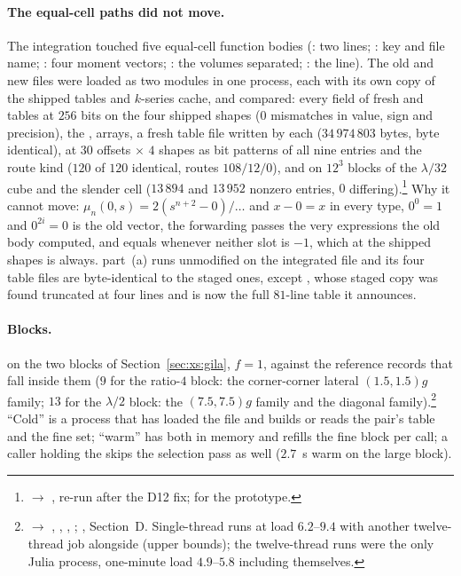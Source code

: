 \paragraph{The equal-cell paths did not move.} The integration touched five equal-cell
function bodies (: two lines; : key and file name;
: four moment vectors; : the volumes separated;
: the  line). The old and new files were loaded as two modules
in one process, each with its own copy of the shipped tables and $k$-series cache, and
compared: every field of fresh  and  tables at $256$ bits on the
four shipped shapes ($0$ mismatches in value, sign and precision), the ,
 arrays, a fresh table file written by each ($34\,974\,803$ bytes, byte
identical),  at $30$ offsets $\times$ $4$ shapes as  bit
patterns of all nine entries and the route kind ($120$ of $120$ identical, routes
$108/12/0$), and  on $12^3$ blocks of the $\lambda/32$ cube and the slender
cell ($13\,894$ and $13\,952$ nonzero entries, $0$ differing).\footnote{
$\to$ , re-run after the D12 fix;  for
the prototype.} Why it cannot move: $\mu_n(0,s) = 2(s^{n+2}-0)/\dots$ and $x-0 = x$ in
every type, $0^0 = 1$ and $0^{2i} = 0$ is the old  vector, the forwarding
 passes the very expressions the old body computed, and  equals
 whenever neither slot is $-1$, which at the shipped shapes is always.
 part~(a) runs unmodified on the integrated file and its four table files
are byte-identical to the staged ones, except , whose staged copy was found
truncated at four lines and is now the full $81$-line table it announces.

\paragraph{Blocks.}  on the two blocks of Section~\ref{sec:xs:gila}, $f = 1$,
against the reference records that fall inside them ($9$ for the ratio-$4$ block: the
corner-corner lateral $(1.5,1.5)g$ family; $13$ for the $\lambda/2$ block: the
$(7.5,7.5)g$ family and the diagonal family).\footnote{
$\to$ , , ,
; , Section~D. Single-thread runs
at load $6.2$--$9.4$ with another twelve-thread job alongside (upper bounds); the
twelve-thread runs were the only Julia process, one-minute load $4.9$--$5.8$ including
themselves.} ``Cold'' is a process that has loaded the file and builds or reads the pair's
table and the fine set; ``warm'' has both in memory and refills the fine block per call; a
caller holding the  skips the selection pass as well ($2.7$~s warm on the
large block).

